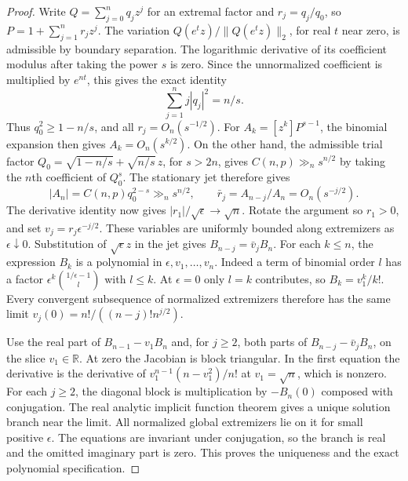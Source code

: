 \documentclass[11pt]{article}
\begin{document}
\begin{proof}
Write \(Q=\sum_{j=0}^n q_jz^j\) for an extremal factor and
\(r_j=q_j/q_0\), so \(P=1+\sum_{j=1}^n r_jz^j\).
The variation \(Q(e^t z)/\|Q(e^t z)\|_2\), for real \(t\)
near zero, is admissible by boundary separation. The logarithmic
derivative of its coefficient modulus after taking the power
\(s\) is zero. Since the unnormalized coefficient is multiplied
by \(e^{nt}\), this gives the exact identity
\[
 \sum_{j=1}^n j|q_j|^2=n/s.
\]
Thus \(q_0^2\geq1-n/s\), and all \(r_j=O_n(s^{-1/2})\).
For \(A_k=[z^k]P^{s-1}\), the binomial expansion then gives
\(A_k=O_n(s^{k/2})\). On the other hand, the admissible trial
factor \(Q_0=\sqrt{1-n/s}+\sqrt{n/s}\,z\), for \(s>2n\),
gives \(C(n,p)\gg_n s^{n/2}\) by taking the \(n\)th coefficient
of \(Q_0^s\). The stationary jet therefore gives
\[
 |A_n|=C(n,p)q_0^{2-s}\gg_n s^{n/2},\qquad
 \bar r_j=A_{n-j}/A_n=O_n(s^{-j/2}).
\]
The derivative identity now gives \(|r_1|/\sqrt\epsilon\to\sqrt n\).
Rotate the argument so \(r_1>0\), and set
\(v_j=r_j\epsilon^{-j/2}\). These variables are uniformly bounded
along extremizers as \(\epsilon\downarrow0\).
Substitution of \(\sqrt\epsilon z\) in the jet gives
\(B_{n-j}=\bar v_j B_n\).
For each \(k\le n\), the expression \(B_k\) is a polynomial
in \(\epsilon,v_1,\ldots,v_n\). Indeed a term of binomial order
\(l\) has a factor \(\epsilon^k\binom{1/\epsilon-1}{l}\)
with \(l\le k\). At \(\epsilon=0\) only \(l=k\) contributes,
so \(B_k=v_1^k/k!\). Every convergent subsequence of normalized
extremizers therefore has the same limit
\(v_j(0)=n!/((n-j)!n^{j/2})\).

Use the real part of \(B_{n-1}-v_1B_n\) and, for \(j\ge2\),
both parts of \(B_{n-j}-\bar v_jB_n\), on the slice
\(v_1\in\mathbb R\). At zero the Jacobian is block triangular.
In the first equation the derivative is the derivative of
\(v_1^{n-1}(n-v_1^2)/n!\) at \(v_1=\sqrt n\), which is nonzero.
For each \(j\ge2\), the diagonal block is multiplication by
\(-B_n(0)\) composed with conjugation. The real analytic implicit
function theorem gives a unique solution branch near the limit.
All normalized global extremizers lie on it for small positive
\(\epsilon\). The equations are invariant under conjugation,
so the branch is real and the omitted imaginary part is zero.
This proves the uniqueness and the exact polynomial specification.


\end{proof}
\end{document}
